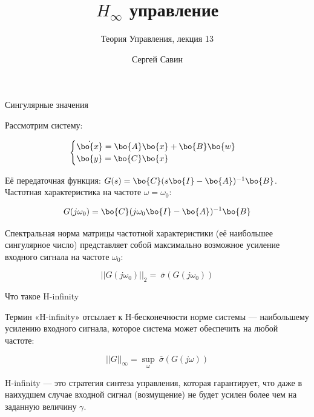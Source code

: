 \documentclass{beamer}
\title{$H_\infty$ управление}
\subtitle{Теория Управления, лекция 13}
\author{Сергей Савин}
\date{\mydate}
\begin{document}
	\maketitle
	

	
	
	\begin{frame}{Сингулярные значения}
		\begin{flushleft}
			
			Рассмотрим систему:
			
			\begin{equation}
				\begin{cases}
					\dot{\bo{x}} = \bo{A}\bo{x}+\bo{B}\bo{w}
					\\
					\bo{y} = \bo{C}\bo{x}
				\end{cases}
			\end{equation}
			
			Её передаточная функция: $G(s) = \bo{C} (s\bo{I} - \bo{A})^{-1} \bo{B}$. Частотная характеристика на частоте $\omega = \omega_0$:
			
			\begin{equation}
				G(j\omega_0) = \bo{C} (j\omega_0\bo{I} - \bo{A})^{-1} \bo{B}
			\end{equation}
			
			Спектральная норма матрицы частотной характеристики (её наибольшее сингулярное число) представляет собой максимально возможное усиление входного сигнала на частоте $\omega_0$:
			
			\begin{equation}
				||G(j\omega_0)||_2 =\ \bar{\sigma} (G(j \omega_0))
			\end{equation}
			
			
		\end{flushleft}
	\end{frame}
	
	
	\begin{frame}{Что такое H-infinity}
		\begin{flushleft}
			
			
			Термин «H-infinity» отсылает к H-бесконечности норме системы — наибольшему усилению входного сигнала, которое система может обеспечить на любой частоте:
			
			\begin{equation}
				||G||_{\infty} = \underset{\omega}{\sup} \ \bar{\sigma} (G(j \omega))
			\end{equation}
			
			H-infinity — это стратегия синтеза управления, которая гарантирует, что даже в наихудшем случае входной сигнал (возмущение) не будет усилен более чем на заданную величину $\gamma$.
			
		\end{flushleft}
	\end{frame}
	
\end{document}
